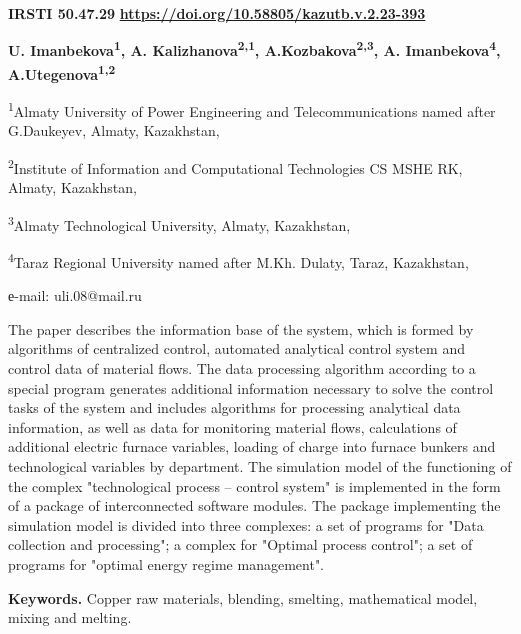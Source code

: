 \newpage
{\bfseries IRSTI 50.47.29}
\hfill {\bfseries \href{https://doi.org/10.58805/kazutb.v.2.23-393}{https://doi.org/10.58805/kazutb.v.2.23-393}}


\begin{center}
{\bfseries U. Imanbekova\textsuperscript{1}\envelope, A.
Kalizhanova\textsuperscript{2,1}, A.Kozbakova\textsuperscript{2,3}, A.
Imanbekova\textsuperscript{4}, A.Utegenova\textsuperscript{1,2}}

\textsuperscript{1}Almaty University of Power Engineering and
Telecommunications named after G.Daukeyev, Almaty, Kazakhstan,

\textsuperscript{2}Institute of Information and Computational
Technologies CS MSHE RK, Almaty, Kazakhstan,

\textsuperscript{3}Almaty Technological University, Almaty, Kazakhstan,

\textsuperscript{4}Taraz Regional University named after M.Kh. Dulaty,
Taraz, Kazakhstan,

е-mail: uli.08@mail.ru
\end{center}

The paper describes the information base of the system, which is formed
by algorithms of centralized control, automated analytical control
system and control data of material flows. The data processing algorithm
according to a special program generates additional information
necessary to solve the control tasks of the system and includes
algorithms for processing analytical data information, as well as data
for monitoring material flows, calculations of additional electric
furnace variables, loading of charge into furnace bunkers and
technological variables by department. The simulation model of the
functioning of the complex "technological process -- control system" is
implemented in the form of a package of interconnected software modules.
The package implementing the simulation model is divided into three
complexes: a set of programs for "Data collection and processing"; a
complex for "Optimal process control"; a set of programs for "optimal
energy regime management".

{\bfseries Keywords.} Copper raw materials, blending, smelting,
mathematical model, mixing and melting.

